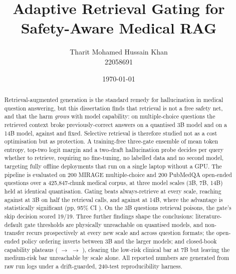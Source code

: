 \documentclass[11pt,a4paper]{report}
\title{Adaptive Retrieval Gating for Safety-Aware Medical RAG}
\author{Tharit Mohamed Hussain Khan\\\small 22058691}
\date{\today}
\begin{document}
\maketitle

\begin{abstract}
Retrieval-augmented generation is the standard remedy for hallucination in
medical question answering, but this dissertation finds that retrieval is
not a free safety net, and that the harm \emph{grows} with model capability:
on multiple-choice questions the retrieved context broke \breakLlama{}
previously-correct answers on a quantised 3B model and \breakQwenFourteen{}
on a 14B model, against \fixLlama{} and \fixQwenFourteen{} fixed. Selective
retrieval is therefore studied not as a cost optimisation but as
protection. A training-free three-gate ensemble of mean token entropy,
top-two logit margin and a two-draft hallucination probe decides per
query whether to retrieve, requiring no fine-tuning, no labelled data and no
second model, targeting fully offline deployments that run on a single
laptop without a GPU. The pipeline is evaluated on 200 MIRAGE
multiple-choice and 200 PubMedQA open-ended questions over a 425,847-chunk
medical corpus, at three model scales (3B, 7B, 14B) held at identical
quantisation. Gating beats always-retrieve at every scale, reaching
\accPfiveMcq{} against \accPoneMcq{} at 3B on half the retrieval calls, and
\accQwenFourteenPfiveMcq{} against \accQwenFourteenPoneMcq{} at 14B, where
the advantage is statistically significant (\diffFourteenPfivePone{}pp, 95\%
CI \diffFourteenPfivePoneCI{}). On the 3B questions retrieval poisons, the
gate's skip decision scored 19/19. Three further findings shape the
conclusions: literature-default gate thresholds are physically unreachable
on quantised models, and non-transfer recurs prospectively at every new
scale and across question formats; the open-ended policy ordering inverts
between 3B and the larger models; and closed-book capability plateaus
(\accPthreeMcq{} $\rightarrow$ \accQwenPthreeMcq{} $\rightarrow$
\accQwenFourteenPthreeMcq{}), clearing the \barLow{} low-risk clinical bar
at 7B but leaving the \barMedium{} medium-risk bar unreachable by scale
alone. All reported numbers are generated from raw run logs under a
drift-guarded, 240-test reproducibility harness.
\end{abstract}


\end{document}
